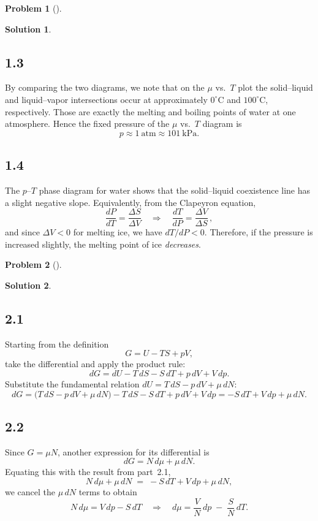 \documentclass[12pt]{article}
\theoremstyle{definition} %
\newtheorem{solution}{Solution}
\newtheorem{problem}{Problem}
\theoremstyle{plain} %
\begin{document}
\begin{problem}[]
  
\end{problem}
\begin{solution}
  \subsection*{1.3}
By comparing the two diagrams, we note that on the \(\mu\) vs.\ \(T\) plot the solid–liquid and liquid–vapor intersections occur at approximately \(0^\circ\mathrm{C}\) and \(100^\circ\mathrm{C}\), respectively.  Those are exactly the melting and boiling points of water at one atmosphere.  Hence the fixed pressure of the \(\mu\) vs.\ \(T\) diagram is
\[
  p \approx 1~\mathrm{atm} \approx 101~\mathrm{kPa}.
\]

\subsection*{1.4}
The \(p\)–\(T\) phase diagram for water shows that the solid–liquid coexistence line has a slight negative slope.  Equivalently, from the Clapeyron equation,
\[
  \frac{dP}{dT} = \frac{\Delta S}{\Delta V}
  \quad\Longrightarrow\quad
  \frac{dT}{dP} = \frac{\Delta V}{\Delta S}\,,
\]
and since \(\Delta V<0\) for melting ice, we have \(dT/dP<0\).  Therefore, if the pressure is increased slightly, the melting point of ice \emph{decreases}.
\end{solution}
\begin{problem}[]
  
\end{problem}
\begin{solution}
  \subsection*{2.1}
  Starting from the definition
  \[
  G = U - T S + p V,
  \]
  take the differential and apply the product rule:
  \[
  dG = dU - T\,dS - S\,dT + p\,dV + V\,dp.
  \]
  Substitute the fundamental relation \(dU = T\,dS - p\,dV + \mu\,dN\):
  \[
  dG = \bigl(T\,dS - p\,dV + \mu\,dN\bigr)
        - T\,dS - S\,dT + p\,dV + V\,dp
      = -S\,dT + V\,dp + \mu\,dN.
  \]
  
  \subsection*{2.2}
  Since \(G = \mu N\), another expression for its differential is
  \[
  dG = N\,d\mu + \mu\,dN.
  \]
  Equating this with the result from part 2.1,
  \[
  N\,d\mu + \mu\,dN \;=\; -S\,dT + V\,dp + \mu\,dN,
  \]
  we cancel the \(\mu\,dN\) terms to obtain
  \[
  N\,d\mu = V\,dp - S\,dT
  \quad\Longrightarrow\quad
  d\mu = \frac{V}{N}\,dp \;-\;\frac{S}{N}\,dT.
  \] 
\end{solution}
\end{document}
